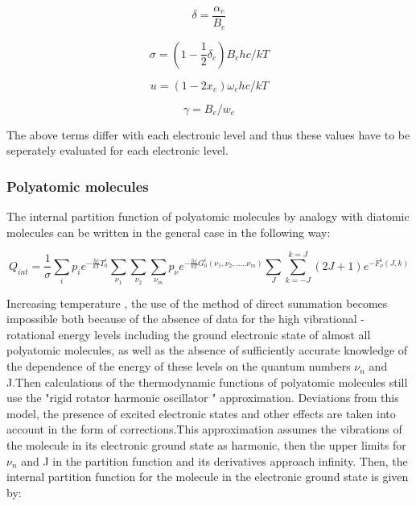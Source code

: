 \documentclass[]{aelab_aiaa-tc}%
\begin{document}
\begin{equation}
\delta = \frac{\alpha_{e}}{B_{e}}
\end{equation}

\begin{equation}
\sigma = (1 - \frac{1}{2}\delta_{e})B_{e}hc/kT	
\end{equation}

\begin{equation}
u = (1 - 2x_{e})\omega_{e}hc/kT	
\end{equation}

\begin{equation}
\gamma = B_{e}/w_{e}
\end{equation}

The above terms differ with each electronic level and thus these values have to be seperately evaluated for each electronic level.

\subsubsection{Polyatomic molecules}
The internal partition function of polyatomic molecules by analogy with diatomic molecules can be written in the general case in the following way:

\begin{equation}
Q_{int} = \frac{1}{\sigma} \sum_{i}^{}p_{i}e^{-\frac{hc}{kT}T_{0}^i} \sum_{\nu_{1}}^{} \sum_{\nu_{2}}^{}\sum_{\nu_{m}}^{} p_{\nu} e^{-\frac{hc}{kT}G_{0}^i(\nu_{1},\nu_{2},.....\nu_{m})}\sum_{J}^{}\sum_{k = -J}^{k = J}(2J+1)e^{-F_{\nu}^i(J,k)}
\end{equation}

Increasing temperature , the use of the method of direct summation becomes impossible both because of the absence of data for the high vibrational -rotational energy levels including the ground electronic state of
almost all polyatomic molecules, as well as the absence of sufficiently accurate knowledge of the dependence of the energy of these levels on the quantum numbers $\nu_n$ and J.Then calculations of the thermodynamic
functions of polyatomic molecules still use the "rigid rotator harmonic oscillator " approximation. Deviations from this model, the presence of excited electronic states and other effects are taken into account in the form
of corrections.This approximation assumes the vibrations of the molecule in its electronic ground state as harmonic, then the upper limits for $\nu_n$ and J in the partition function and its derivatives approach infinity. Then, the internal partition function for the molecule in the electronic ground state is given by:
\end{document}
